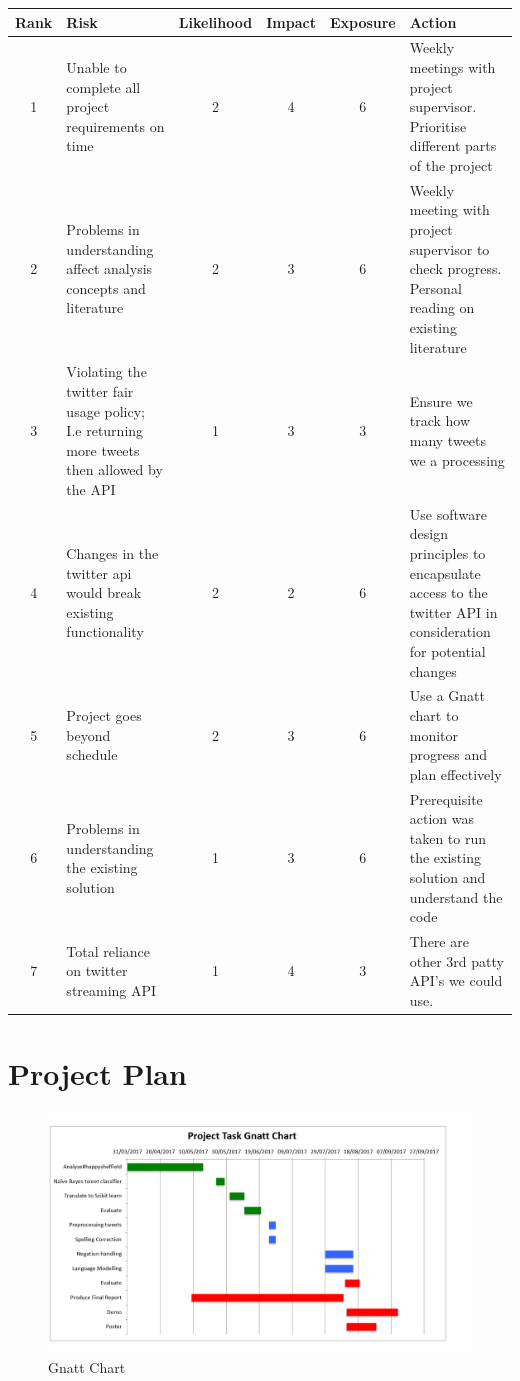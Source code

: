 \begin{table}[H]
\centering
\begin{tabular}{|c|m{5cm}|c|c|c|m{5cm}|} 
 \hline
 Rank & Risk & Likelihood & Impact & Exposure & Action \\ [0.5ex] 
 \hline\hline
 
1& Unable to complete all project requirements on time&2&4&6&Weekly meetings with project supervisor. Prioritise different parts of the project \\ 
\hline
2&Problems in understanding affect analysis concepts and literature&2&3&6&Weekly meeting with project supervisor to check progress.  Personal reading on existing literature \\ 
\hline
3&Violating the twitter fair usage policy; I.e returning more tweets then allowed by the API&1&3&3&Ensure we track how many tweets we a processing \\ 
\hline
4&Changes in the twitter api would break existing functionality&2&2&6&Use software design principles to encapsulate access to the twitter API in consideration for potential changes \\ 
\hline
5&Project goes beyond schedule&2&3&6&Use a Gnatt chart to monitor progress and plan effectively \\ 
\hline
6&Problems in understanding the existing solution&1&3&6&Prerequisite action was taken to run the existing solution and understand the code \\ 
\hline
7&Total reliance on twitter streaming API&1&4&3&There are other 3rd patty API's we could use. \\ 
\hline
\end{tabular}

\end{table}

\section{Project Plan} \label{gnatt}


\begin{figure}[H]
\includegraphics[width=18cm]{images/gnatt.PNG}
\caption{Gnatt Chart}
\end{figure}

